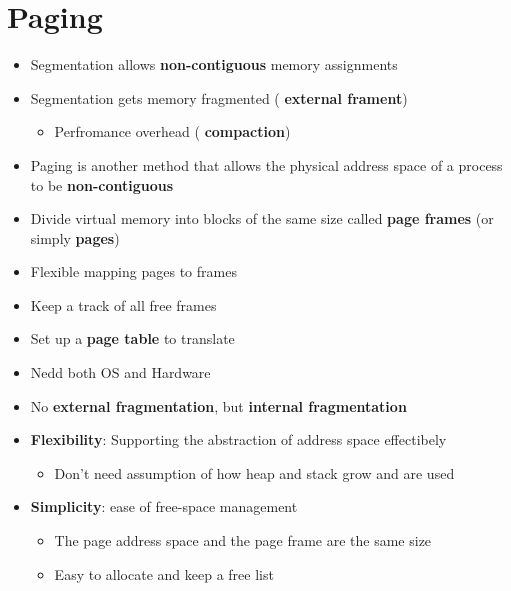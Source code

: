 \documentclass[a4paper,11pt,english]{article}
\begin{document}


\section*{Paging}
\begin{itemize}
    \item Segmentation allows \textbf{\color{blue} non-contiguous} memory assignments
    \item Segmentation gets memory fragmented (\textbf{\color{red} external frament})
        \begin{itemize}
            \item Perfromance overhead (\textbf{\color{red} compaction})
        \end{itemize}
    \item Paging is another method that allows the physical address space of a process to be \textbf{\color{blue} non-contiguous}
    \item Divide virtual memory into blocks of the same size called \textbf{\color{blue} page frames} (or simply \textbf{\color{blue} pages})
    \item Flexible mapping pages to frames
    \item Keep a track of all free frames
    \item Set up a \textbf{\color{blue} page table} to translate
    \item Nedd both OS and Hardware
    \item No \textbf{\color{blue} external fragmentation}, but \textbf{\color{red} internal fragmentation} 

    \item \textbf{Flexibility}: Supporting the abstraction of address space effectibely
        \begin{itemize}
            \item Don't need assumption of how heap and stack grow and are used
        \end{itemize}
    \item \textbf{Simplicity}: ease of free-space management
        \begin{itemize}
            \item The page address space and the page frame are the same size
            \item Easy to allocate and keep a free list
        \end{itemize}
\end{itemize}
\end{document}

